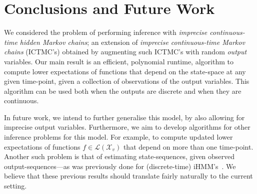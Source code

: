 \documentclass[twoside,11pt]{article}
\newcommand{\states}{\mathcal{X}}
\newcommand{\lexp}{\underline{\mathbb{E}}_{\rateset,\mathcal{M}}}
\newcommand{\gambles}{\mathcal{L}}
\newcommand{\rateset}{\mathcal{Q}}
\begin{document}
\section{Conclusions and Future Work}\label{sec:conclusions}

We considered the problem of performing inference with \emph{imprecise continuous-time hidden Markov chains}; an extension of \emph{imprecise continuous-time Markov chains} (ICTMC's) obtained by augmenting such ICTMC's with random \emph{output} variables. %
Our main result is an efficient, polynomial runtime, algorithm to compute lower expectations of functions that depend on the state-space at any given time-point, given a collection of observations of the output variables. This algorithm can be used both when the outputs are discrete and when they are continuous.

In future work, we intend to further generalise this model, by also allowing for imprecise output variables. Furthermore, we aim to develop algorithms for other inference problems for this model. 
For example, to compute updated lower expectations of functions $f\in\gambles(\states_v)$ that depend on more than one time-point. Another such problem is that of estimating state-sequences, given observed output-sequences---as was previously done for (discrete-time) iHMM's~\citep{DeBock:2014ts}. We believe that these previous results should 
translate fairly naturally to the current setting.

%
\end{document}
